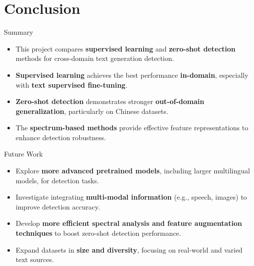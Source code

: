 \documentclass[serif]{beamer}
\begin{document}
\section{Conclusion}


\begin{frame}{Summary}
\begin{itemize}
  \item This project compares \textbf{supervised learning} and \textbf{zero-shot detection} methods for cross-domain text generation detection.
  \item \textbf{Supervised learning} achieves the best performance \textbf{in-domain}, especially with \textbf{text supervised fine-tuning}.
  \item \textbf{Zero-shot detection} demonstrates stronger \textbf{out-of-domain generalization}, particularly on Chinese datasets.
  \item The \textbf{spectrum-based methods} provide effective feature representations to enhance detection robustness.
\end{itemize}
\end{frame}

\begin{frame}{Future Work}
\begin{itemize}
  \item Explore \textbf{more advanced pretrained models}, including larger multilingual models, for detection tasks.
  \item Investigate integrating \textbf{multi-modal information} (e.g., speech, images) to improve detection accuracy.
  \item Develop \textbf{more efficient spectral analysis and feature augmentation techniques} to boost zero-shot detection performance.
  \item Expand datasets in \textbf{size and diversity}, focusing on real-world and varied text sources.
\end{itemize}
\end{frame}
    
\end{document}
